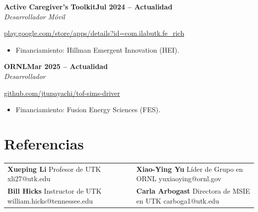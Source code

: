 \documentclass[10pt,letterpaper]{article}
\newcommand{\entrynoloc}[3]{%
  \vspace{3pt}\noindent\textbf{#1}\hfill\textbf{#2}\\[-1pt]
  \noindent\textit{#3}\par\vspace{1pt}}
\begin{document}
\entrynoloc{Active Caregiver's Toolkit}{Jul 2024 -- Actualidad}{Desarrollador Móvil}
{\small \url{play.google.com/store/apps/details?id=com.ilabutk.fe_rich}}
\begin{itemize}\item Financiamiento: Hillman Emergent Innovation (HEI).\end{itemize}

\entrynoloc{ORNL}{Mar 2025 -- Actualidad}{Desarrollador}
{\small \url{github.com/jtupayachi/tof-sims-driver}}
\begin{itemize}\item Financiamiento: Fusion Energy Sciences (FES).\end{itemize}

\section{Referencias}
\noindent\begin{tabular}{@{}p{}p{}@{}}
\textbf{Xueping Li} \newline Profesor de UTK \newline xli27@utk.edu &
\textbf{Xiao-Ying Yu} \newline Líder de Grupo en ORNL \newline yuxiaoying@ornl.gov \\[5pt]
\textbf{Bill Hicks} \newline Instructor de UTK \newline william.hicks@tennessee.edu &
\textbf{Carla Arbogast} \newline Directora de MSIE en UTK \newline carboga1@utk.edu
\end{tabular}
\end{document}
